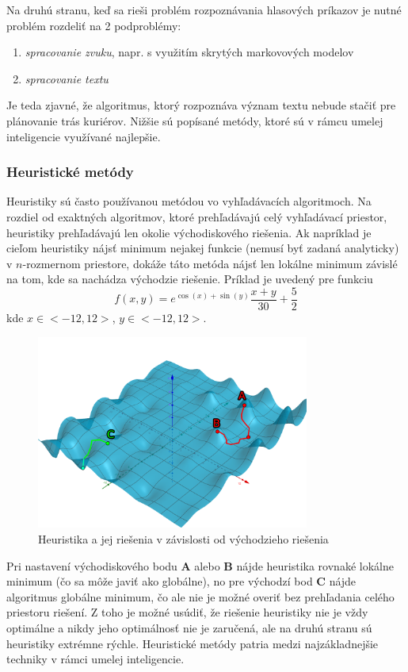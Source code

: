 Na druhú stranu, keď sa rieši problém rozpoznávania hlasových príkazov je nutné problém rozdeliť na 2 podproblémy:
\begin{enumerate}
    \item \emph{spracovanie zvuku}, napr. s využitím skrytých markovových modelov\cite{hmm}
    \item \emph{spracovanie textu}\cite{text_analysis}
\end{enumerate}

Je teda zjavné, že algoritmus, ktorý rozpoznáva význam textu nebude stačiť pre plánovanie trás kuriérov.
Nižšie sú popísané metódy, ktoré sú v rámcu umelej inteligencie využívané najlepšie.

\subsubsection{Heuristické metódy}

Heuristiky sú často používanou metódou vo vyhľadávacích algoritmoch.
Na rozdiel od exaktných algoritmov, ktoré prehľadávajú celý vyhľadávací priestor, heuristiky prehľadávajú len okolie
východiskového riešenia.
Ak napríklad je cieľom heuristiky nájsť minimum nejakej funkcie (nemusí byť zadaná analyticky) v $n$-rozmernom priestore,
dokáže táto metóda nájsť len lokálne minimum závislé na tom, kde sa nachádza východzie riešenie.
Príklad je uvedený pre funkciu
\begin{equation}
    f(x,y)=e^{\cos(x)+\sin(y)}\frac{x+y}{30}+\frac{5}{2}
\end{equation}
kde $x\in<-12,12>$, $y\in<-12,12>$.
\begin{figure}[H]
    \centering
    \includegraphics[width=0.8\textwidth]{images/heuristic.png}
    \caption{Heuristika a jej riešenia v závislosti od východzieho riešenia}
\end{figure}\label{figure:heuristic-method}
Pri nastavení východiskového bodu \textbf{A} alebo \textbf{B} nájde heuristika rovnaké lokálne minimum (čo sa môže javiť
ako globálne), no pre východzí bod \textbf{C} nájde algoritmus globálne minimum, čo ale nie je možné overiť bez
prehľadania celého priestoru riešení.
Z toho je možné usúdiť, že riešenie heuristiky nie je vždy optimálne a nikdy jeho optimálnosť nie je zaručená, ale na
druhú stranu sú heuristiky extrémne rýchle.
Heuristické metódy patria medzi najzákladnejšie techniky v rámci umelej inteligencie.

